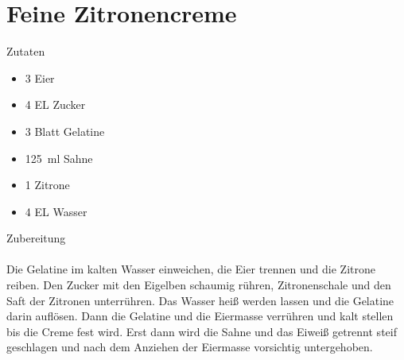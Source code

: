 \section*{Feine Zitronencreme}
\ihead{}\ohead{}
\cfoot{}
{\Large Zutaten}
\begin{multicols}{2}
\begin{itemize}
    \item \num{3} Eier
    \item \num{4} EL Zucker
    \item \num{3} Blatt Gelatine
    \item \SI{125}{ml} Sahne
    \item \num{1} Zitrone
    \item \num{4} EL Wasser
\end{itemize}
\end{multicols}
\noindent
{\Large Zubereitung}\\
\\
Die Gelatine im kalten Wasser einweichen, die Eier trennen und die Zitrone reiben.
Den Zucker mit den Eigelben schaumig rühren, Zitronenschale und den Saft der Zitronen unterrühren.
Das Wasser heiß werden lassen und die Gelatine darin auflösen.
Dann die Gelatine und die Eiermasse verrühren und kalt stellen bis die Creme fest wird.
Erst dann wird die Sahne und das Eiweiß getrennt steif geschlagen und nach dem Anziehen der Eiermasse vorsichtig untergehoben.
